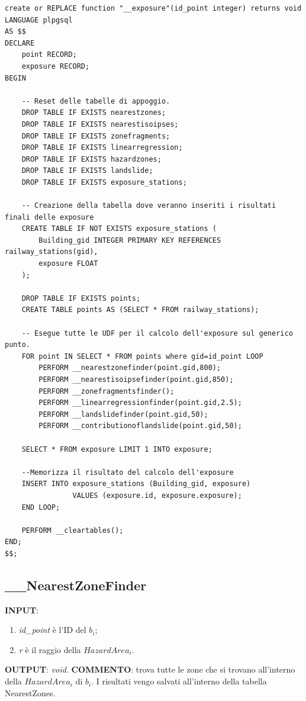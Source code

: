 \small
\begin{lstlisting}[style = mystyle]
create or REPLACE function "__exposure"(id_point integer) returns void
LANGUAGE plpgsql
AS $$
DECLARE
	point RECORD;
	exposure RECORD;
BEGIN
	
	-- Reset delle tabelle di appoggio.
	DROP TABLE IF EXISTS nearestzones;
	DROP TABLE IF EXISTS nearestisoipses;
	DROP TABLE IF EXISTS zonefragments;
	DROP TABLE IF EXISTS linearregression;
	DROP TABLE IF EXISTS hazardzones;
	DROP TABLE IF EXISTS landslide;
	DROP TABLE IF EXISTS exposure_stations;
	
	-- Creazione della tabella dove veranno inseriti i risultati finali delle exposure
	CREATE TABLE IF NOT EXISTS exposure_stations (
		Building_gid INTEGER PRIMARY KEY REFERENCES railway_stations(gid),
		exposure FLOAT
	);

	DROP TABLE IF EXISTS points;
	CREATE TABLE points AS (SELECT * FROM railway_stations);

	-- Esegue tutte le UDF per il calcolo dell'exposure sul generico punto.
	FOR point IN SELECT * FROM points where gid=id_point LOOP
		PERFORM __nearestzonefinder(point.gid,800);
		PERFORM __nearestisoipsefinder(point.gid,850);
		PERFORM __zonefragmentsfinder();
		PERFORM __linearregressionfinder(point.gid,2.5);
		PERFORM __landslidefinder(point.gid,50);
		PERFORM __contributionoflandslide(point.gid,50);

	SELECT * FROM exposure LIMIT 1 INTO exposure;
	
	--Memorizza il risultato del calcolo dell'exposure
	INSERT INTO exposure_stations (Building_gid, exposure) 
				VALUES (exposure.id, exposure.exposure);
	END LOOP;

	PERFORM __cleartables();
END;
$$;
\end{lstlisting}

\newpage
\subsection{\_\_NearestZoneFinder}
\textbf{INPUT}: 
\begin{enumerate}
	\item \textit{id\_point} è l'ID del $b_i$;
	\item \textit{r} è il raggio della $HazardArea_i$.
\end{enumerate}
\textbf{OUTPUT}: \textit{void}. \newline
\textbf{COMMENTO}: trova tutte le zone che si trovano all'interno della $HazardArea_i$ di $b_i$. I risultati vengo salvati all'interno della tabella NearestZones.

